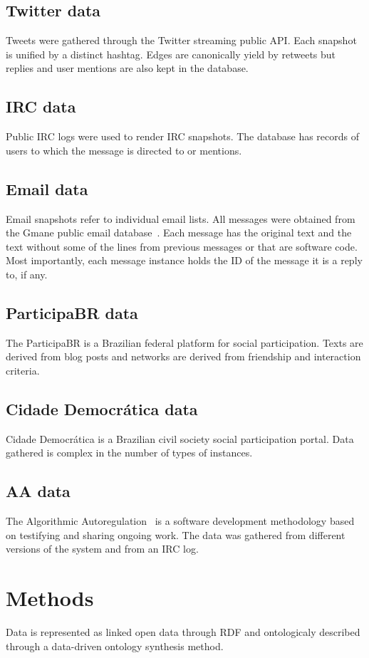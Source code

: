 \documentclass[review]{elsarticle}
\begin{document}
\subsection{Twitter data}
Tweets were gathered through the Twitter streaming public API.
Each snapshot is unified by a distinct hashtag.
Edges are canonically yield by retweets but replies and user mentions
are also kept in the database.

\subsection{IRC data}
Public IRC logs were used to render IRC snapshots.
The database has records of users to which the message is directed to or
mentions.

\subsection{Email data}
Email snapshots refer to individual email lists.
All messages were obtained from the Gmane public email database~\cite{gmane}.
Each message has the original text and the text without some of the lines
from previous messages or that are software code.
Most importantly, each message instance holds the ID of the message it is
a reply to, if any.

\subsection{ParticipaBR data}
The ParticipaBR is a Brazilian federal platform for social participation.
Texts are derived from blog posts and networks are derived from
friendship and interaction criteria.


\subsection{Cidade Democr\'atica data}
Cidade Democr\'atica is a Brazilian civil society social participation portal.
Data gathered is complex in the number of types of instances.

\subsection{AA data}
The Algorithmic Autoregulation~\cite{aa} is a software development
methodology based on testifying and sharing ongoing work.
The data was gathered from different versions of the system and from an IRC
log.

\section{Methods}
Data is represented as linked open data through
RDF and ontologicaly described through a data-driven ontology synthesis
method.
\end{document}
